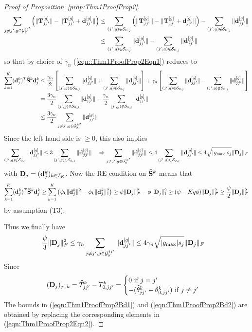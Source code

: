 \documentclass[12pt, letterpaper]{article}
\numberwithin{equation}{section}
\begin{document}
\begin{proof}[Proof of Proposition~\ref{prop:Thm1ProofProp2}]
%
\begin{align*}
\sum_{j \neq j', g \in {\cal{G}}_y^{jj'}} \left( \| {\mathbf{T}}_{jj'}^{[g]} \| -  \| {\mathbf{T}}_{jj'}^{[g]} + {\bf{d}}_{jj'}^{[g]}\| \right) & \leq
\sum_{(j',g) \in {\cal{S}}_{0,j}} \left( \| {\mathbf{T}}_{jj'}^{[g]} \| -  \| {\mathbf{T}}_{jj'}^{[g]} + {\bf{d}}_{jj'}^{[g]}\| \right) -
\sum_{(j',g) \notin {\cal{S}}_{0,j}} \| {\bf{d}}_{jj'}^{[g]} \|\\
& \leq \sum_{(j',g) \in {\cal{S}}_{0,j}} \| {\bf{d}}_{jj'}^{[g]} \| - \sum_{(j',g) \notin {\cal{S}}_{0,j}} \| {\bf{d}}_{jj'}^{[g]} \|
\end{align*}
so that by choice of $\gamma_n$ (\ref{eqn::Thm1ProofProp2Eqn1}) reduces to
%
\begin{align}\label{eqn:Thm1ProofProp2Eqn3}
\sum_{k=1}^K ({\bf{d}}_j^k)^T \widehat {{\mathbf{S}}}^k {\bf{d}}_j^k & \leq 
\frac{\gamma_n}{2} \left[ \sum_{(j',g) \in {\cal{S}}_{0,j}} \| {\bf{d}}_{jj'}^{[g]} \| + \sum_{(j',g) \notin {\cal{S}}_{0,j}} \| {\bf{d}}_{jj'}^{[g]} \| \right] +
\gamma_n \left[ \sum_{(j',g) \in {\cal{S}}_{0,j}} \| {\bf{d}}_{jj'}^{[g]} \| - \sum_{(j',g) \notin {\cal{S}}_{0,j}} \| {\bf{d}}_{jj'}^{[g]} \| \right] \notag\\
& = \frac{3 \gamma_n}{2} \sum_{(j',g) \in {\cal{S}}_{0,j}} \| {\bf{d}}_{jj'}^{[g]} \| - \frac{\gamma_n}{2} \sum_{(j',g) \notin {\cal{S}}_{0,j}} \| {\bf{d}}_{jj'}^{[g]} \| \notag\\
& \leq \frac{3 \gamma_n}{2} \sum_{j \neq j', g \in {\cal{G}}_y^{jj'}} \| {\bf{d}}_{jj'}^{[g]} \|
\end{align}
%
Since the left hand side is $\geq 0$, this also implies
%
$$
\sum_{(j',g) \notin {\cal{S}}_{0,j}} \| {\bf{d}}_{jj'}^{[g]} \| \leq 3 \sum_{(j',g) \in {\cal{S}}_{0,j}} \| {\bf{d}}_{jj'}^{[g]} \| \quad \Rightarrow
\sum_{j \neq j', g \in {\cal{G}}_y^{jj'}} \| {\bf{d}}_{jj'}^{[g]} \| \leq
4 \sum_{(j',g) \in {\cal{S}}_{0,j}} \| {\bf{d}}_{jj'}^{[g]} \| \leq 4 \sqrt{| g_{\max}| s_j} \| {\mathbf{D}}_j \|_F
$$
% 
with ${\mathbf{D}}_j = ({\bf{d}}_j^k)_{k \in {\cal{I}}_K}$. Now the RE condition on $\widehat {{\mathbf{S}}}^k$ means that
%
$$
\sum_{k=1}^K ({\bf{d}}_j^k)^T \widehat {{\mathbf{S}}}^k {\bf{d}}_j^k \geq 
\sum_{k=1}^K \left( \psi_k \| {\bf{d}}_j^k \|^2 - \phi_k \| {\bf{d}}_j^k \|_1^2 \right) \geq
\psi \| {\mathbf{D}}_j \|_F^2 - \phi \| {\mathbf{D}}_j \|_1^2 \geq 
(\psi - Kq \phi ) \| {\mathbf{D}}_j \|_F^2 \geq \frac{\psi}{2}  \| {\mathbf{D}}_j \|_F^2
$$
%
by assumption (T3).

Thus we finally have
%
\begin{align}\label{eqn:Thm1ProofProp2Eqn2}
\frac{\psi}{3} \| {\mathbf{D}}_j \|_F^2 & \leq
\gamma_n \sum_{j \neq j', g \in {\cal{G}}_y^{jj'}} \| {\bf{d}}_{jj'}^{[g]} \| \leq
4 \gamma_n \sqrt{| g_{\max}| s_j} \| {\mathbf{D}}_j\|_F
\end{align}
%
Since
%
$$
({\mathbf{D}}_j)_{j',k} = \widehat T_{jj'}^k - T_{0,jj'}^k = \begin{cases}
0 \text{ if } j = j'\\
-(\widehat \theta_{jj'}^k - \theta_{0,jj'}^k ) \text{ if } j \neq j'
\end{cases}
$$
%
The bounds in (\ref{eqn:Thm1ProofProp2Bd1}) and (\ref{eqn:Thm1ProofProp2Bd2}) are obtained by replacing the corresponding elements in (\ref{eqn:Thm1ProofProp2Eqn2}).


\end{proof}
\end{document}
